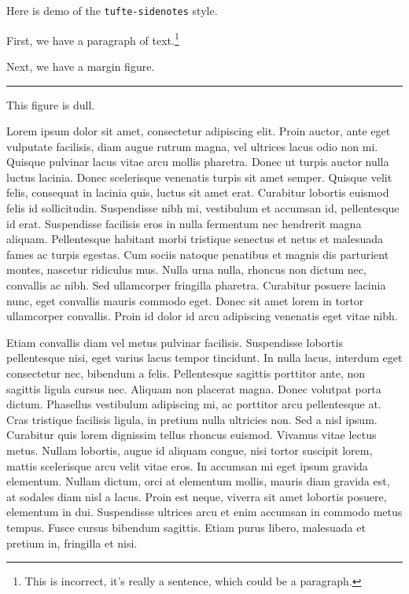 \documentclass{article}
\begin{document}
Here is demo of the \verb#tufte-sidenotes# style.

First, we have a paragraph of text.\footnote{This is incorrect, it's really a sentence, which could be a paragraph.}

Next, we have a margin figure.
\begin{marginfigure}
\centering
\rule{1in}{1in}
\caption{This figure is dull.}
\end{marginfigure}

Lorem ipsum dolor sit amet, consectetur adipiscing elit. Proin auctor, ante eget vulputate facilisis, diam augue rutrum magna, vel ultrices lacus odio non mi. Quisque pulvinar lacus vitae arcu mollis pharetra. Donec ut turpis auctor nulla luctus lacinia. Donec scelerisque venenatis turpis sit amet semper. Quisque velit felis, consequat in lacinia quis, luctus sit amet erat. Curabitur lobortis euismod felis id sollicitudin. Suspendisse nibh mi, vestibulum et accumsan id, pellentesque id erat. Suspendisse facilisis eros in nulla fermentum nec hendrerit magna aliquam. Pellentesque habitant morbi tristique senectus et netus et malesuada fames ac turpis egestas. Cum sociis natoque penatibus et magnis dis parturient montes, nascetur ridiculus mus. Nulla urna nulla, rhoncus non dictum nec, convallis ac nibh. Sed ullamcorper fringilla pharetra. Curabitur posuere lacinia nunc, eget convallis mauris commodo eget. Donec sit amet lorem in tortor ullamcorper convallis. Proin id dolor id arcu adipiscing venenatis eget vitae nibh.

Etiam convallis diam vel metus pulvinar facilisis. Suspendisse lobortis pellentesque nisi, eget varius lacus tempor tincidunt. In nulla lacus, interdum eget consectetur nec, bibendum a felis. Pellentesque sagittis porttitor ante, non sagittis ligula cursus nec. Aliquam non placerat magna. Donec volutpat porta dictum. Phasellus vestibulum adipiscing mi, ac porttitor arcu pellentesque at. Cras tristique facilisis ligula, in pretium nulla ultricies non. Sed a nisl ipsum. Curabitur quis lorem dignissim tellus rhoncus euismod. Vivamus vitae lectus metus. Nullam lobortis, augue id aliquam congue, nisi tortor suscipit lorem, mattis scelerisque arcu velit vitae eros. In accumsan mi eget ipsum gravida elementum. Nullam dictum, orci at elementum mollis, mauris diam gravida est, at sodales diam nisl a lacus. Proin est neque, viverra sit amet lobortis posuere, elementum in dui. Suspendisse ultrices arcu et enim accumsan in commodo metus tempus. Fusce cursus bibendum sagittis. Etiam purus libero, malesuada et pretium in, fringilla et nisi.
\end{document}
